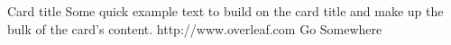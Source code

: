 \documentclass[12pt,a4paper]{article}
\begin{document}
\begin{card}
    {Card title}
    {Some quick example text to build on the card title and make up the bulk of the card's content.}
    {http://www.overleaf.com}
    {Go Somewhere}
\end{card}
\end{document}
